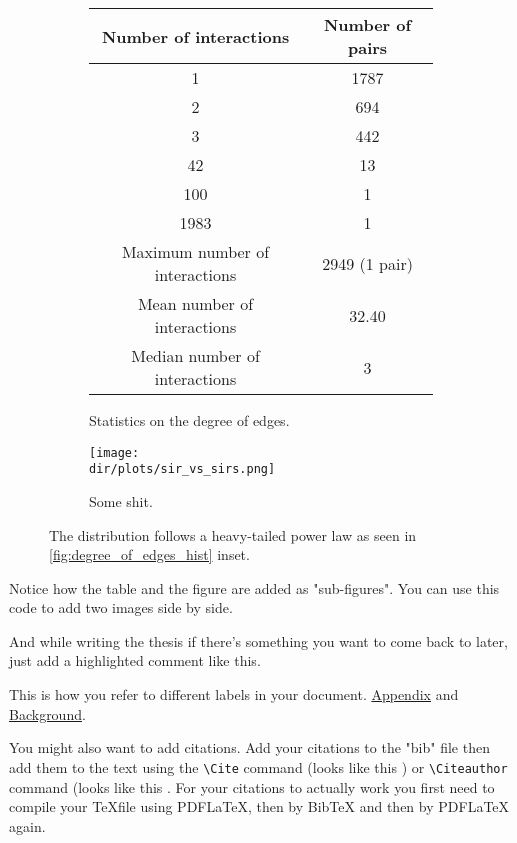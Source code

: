 \begin{figure}
\centering
\begin{subfigure}{\textwidth}
  \centering
  \begin{tabular}{ | c c |}
    \hline
    Number of interactions & Number of pairs\\ \hline
    1 & 1787 \\ 
    2 & 694 \\
    3 & 442 \\
    42 & 13 \\ 
    100 & 1 \\ 
    1983 & 1 \\
    \hline
    Maximum number of interactions & 2949 (1 pair) \\
    Mean number of interactions & 32.40 \\
    Median number of interactions & 3 \\
    \hline
  \end{tabular}
\caption{Statistics on the degree of edges.}
\label{table:degree_of_edges}
\end{subfigure}%

\begin{subfigure}{\textwidth}
\centering
\captionsetup{justification=centering}
\texttt{[image: \\dir/plots/sir\_vs\_sirs.png]}
\caption{Some shit.}
\label{fig:some_shit}
\end{subfigure}
\caption{The distribution follows a heavy-tailed power law as seen in \ref{fig:degree_of_edges_hist} inset.}
\end{figure}

Notice how the table and the figure are added as "sub-figures". You can use this code to add two images side by side.

And while writing the thesis if there's something you want to come back to later, just add a highlighted comment like this. 

This is how you refer to different labels in your document. \hyperref[ch:appendix]{Appendix} and \hyperref[ch:background]{Background}.

You might also want to add citations. Add your citations to the "bib" file then add them to the text using the \lstinline|\Cite| command (looks like this \Cite{mastrandrea2015contact}) or \lstinline|\Citeauthor| command (looks like this . For your citations to actually work you first need to compile your \TeX file using PDFLaTeX, then by BibTeX and then by PDFLaTeX again.